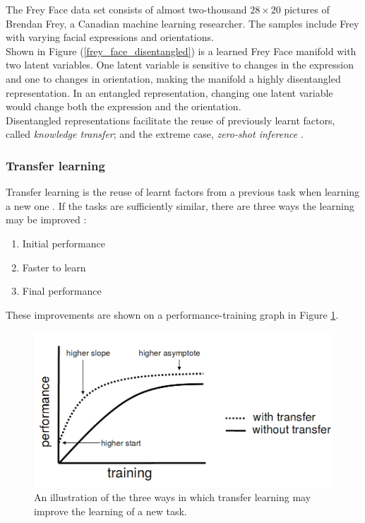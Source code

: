 \documentclass[12pt,twoside]{article}
\begin{document}
The Frey Face data set consists of almost two-thousand $28\times20$ pictures of Brendan Frey, a Canadian machine learning researcher. The samples include Frey with varying facial expressions and orientations.\\

Shown in Figure (\ref{frey_face_disentangled}) is a learned Frey Face manifold with two latent variables. One latent variable is sensitive to changes in the expression and one to changes in orientation, making the manifold a highly disentangled representation. In an entangled representation, changing one latent variable would change both the expression and the orientation.\\

Disentangled representations facilitate the reuse of previously learnt factors, called \textit{knowledge transfer}; and the extreme case, \textit{zero-shot inference} \cite{IanGoodfellowYoshuaBengio2015,Higgins2016}.

\subsubsection{Transfer learning}
\label{subsec:transfer_learning}
Transfer learning is the reuse of learnt factors from a previous task when learning a new one \cite{IanGoodfellowYoshuaBengio2015}. If the tasks are sufficiently similar, there are three ways the learning may be improved \cite{Torrey2009}:

\begin{enumerate}
\item Initial performance
\item Faster to learn
\item Final performance
\end{enumerate}

These improvements are shown on a performance-training graph in Figure \ref{transfer_learning_three_ways}.\\

\begin{figure}
\includegraphics[scale=0.3]{figures/torrey_2009_2.png}
\centering
\captionsetup{justification=centering}
\caption{An illustration of the three ways in which transfer learning may improve the learning of a new task. \cite{Torrey2009}}
\label{transfer_learning_three_ways}
\end{figure}
\end{document}
